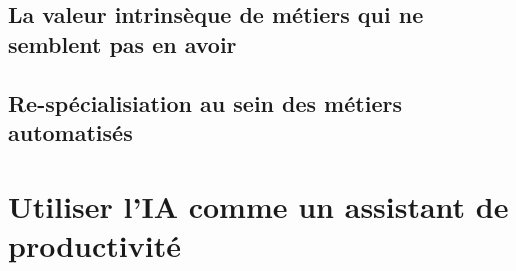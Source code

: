         
        \section{La valeur intrinsèque de métiers qui ne semblent pas en avoir }
        \section{Re-spécialisiation au sein des métiers automatisés}

        


    \chapter{Utiliser l'IA comme un assistant de productivité}
